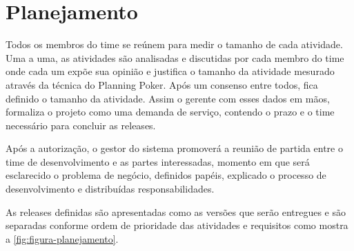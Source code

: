 \section{Planejamento}
\label{sec:atividadesRealizadasPlanejamento}

Todos os membros do time se reúnem para medir o tamanho de cada atividade. Uma a uma, as atividades são analisadas e discutidas por cada membro do time onde cada um expõe sua opinião e justifica o tamanho da atividade mesurado através da técnica do Planning Poker. Após um consenso entre todos, fica definido o tamanho da atividade. Assim o gerente com esses dados em mãos, formaliza o projeto como uma demanda de serviço, contendo o prazo e o time necessário para concluir as releases.

\begin{citacao}
Após a autorização, o gestor do sistema promoverá a reunião de
partida entre o time de desenvolvimento e as partes interessadas, momento em que será
esclarecido o problema de negócio, definidos papéis, explicado o processo de
desenvolvimento e distribuídas responsabilidades.\cite[p.~2]{Portaria37:2017}
\end{citacao}

As releases definidas são apresentadas como as versões que serão entregues e são separadas conforme ordem de prioridade das atividades e requisitos como mostra a \autoref{fig:figura-planejamento}.


